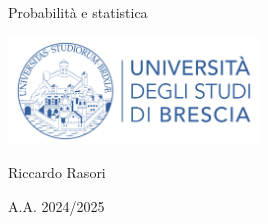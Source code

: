 \documentclass{report}
\begin{document}
\begin{center}
  \vspace*{2cm}
  {\Huge Probabilità e statistica \par}
  \vspace{1cm}
  \includegraphics[width=0.5\textwidth]{logounibs.png}\par
  \vspace{1cm}
  {\Large Riccardo Rasori \par}
  \vspace{0.5cm}
  {\large A.A. 2024/2025 \par}
  \vspace{2cm}
\end{center}

\tableofcontents %
\end{document}
